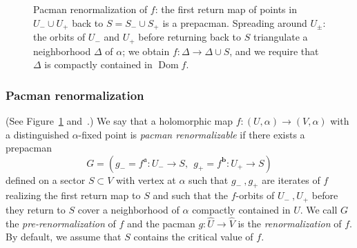 \documentclass{amsart}
\newcommand{\Dom}{\operatorname {Dom}}
\renewcommand{\sp}{{\ \ }}
\newcommand{\1}{{\mathbb 1 }}
\newcommand{\bDelta}{{\mathbb{\Delta}}}
\renewcommand{\aa}{\mathfrak{a}}
\newcommand{\bb}{{\mathbf b}}
\theoremstyle{remark}
\numberwithin{equation}{section}
\theoremstyle{definition}
\theoremstyle{nonumberbreak}
\begin{document}
\begin{figure}[t!]
{} 


\caption{ Pacman renormalization of $f$: the first return map of points in $U_-\cup U_+$ back to $S=S_-\cup S_+$ is a prepacman. Spreading around $U_\pm$: the orbits of $U_-$ and $U_+$ before returning back to $S$ triangulate a neighborhood $\bDelta$ of $\alpha$; we obtain $f\colon \bDelta\to \bDelta\cup S$, and we require that $\bDelta$ is compactly contained in $\Dom f$.}
\label{Fg:Prepacman:OrbitOfUi}
\end{figure}


\subsubsection{Pacman renormalization}\label{sss:prepacman} (See Figure~\ref{Fg:Prepacman:OrbitOfUi} and~\cite[Definition 2.3]{DLS}.) We say that a holomorphic map $f\colon (U,\alpha)\to   (V,\alpha)$ with a distinguished $\alpha$-fixed point is \emph{pacman renormalizable} if there exists a prepacman \[G=(g_-=f^\aa \colon U_-\to S,\sp g_+=f^\bb \colon U_+\to S)\] defined on a sector  $S \subset V$ with vertex at $\alpha$  such that $g_-~, g_+$ are iterates of $f$ realizing the first return map to $S$ and such that the $f$-orbits of $ U_-~, U_+$ before they return to $S$ cover a neighborhood of $\alpha$ compactly contained in $U$. We call $G$ the \emph{pre-renormalization} of $f$ and the pacman $g\colon \widehat{U}\to   \widehat{V} $ is the \emph{renormalization} of $f$. By default, we assume that $S$ contains the critical value of $f$.
\end{document}
